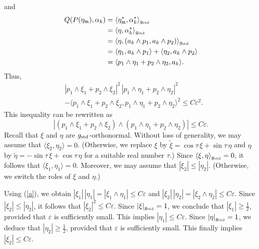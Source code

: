 \documentclass[11pt]{amsart}
\theoremstyle{definition}
\begin{document}
and 
\begin{align*} 
Q(P(\eta_{\mathfrak{m}}),\alpha_k) 
&= \langle \eta_{\mathfrak{m}}^*,\alpha_k^* \rangle_{g_{\text{\rm std}}} \\ 
&= \langle \eta,\alpha_k^* \rangle_{g_{\text{\rm std}}} \\ 
&= \langle \eta,(a_k \wedge p_1,a_k \wedge p_2) \rangle_{g_{\text{\rm std}}} \\ 
&= \langle \eta_1,a_k \wedge p_1 \rangle + \langle \eta_2,a_k \wedge p_2 \rangle \\ 
&= \langle p_1 \wedge \eta_1 + p_2 \wedge \eta_2,a_k \rangle. 
\end{align*} 
Thus, 
\begin{align*} 
&|p_1 \wedge \xi_1 + p_2 \wedge \xi_2|^2 \, |p_1 \wedge \eta_1 + p_2 \wedge \eta_2|^2 \\ 
&- \langle p_1 \wedge \xi_1 + p_2 \wedge \xi_2,p_1 \wedge \eta_1 + p_2 \wedge \eta_2 \rangle^2 \leq C\varepsilon^2. 
\end{align*}
This inequality can be rewritten as 
\begin{equation} 
\label{b}
|(p_1 \wedge \xi_1 + p_2 \wedge \xi_2) \wedge (p_1 \wedge \eta_1 + p_2 \wedge \eta_2)| \leq C\varepsilon. 
\end{equation} 
Recall that $\xi$ and $\eta$ are $g_{\text{\rm std}}$-orthonormal. Without loss of generality, we may assume that $\langle \xi_2,\eta_2 \rangle = 0$. (Otherwise, we replace $\xi$ by $\tilde{\xi} = \cos \tau \, \xi + \sin \tau \, \eta$ and $\eta$ by $\tilde{\eta} = -\sin \tau \, \xi + \cos \tau \, \eta$ for a suitable real number $\tau$.) Since $\langle \xi,\eta \rangle_{g_{\text{\rm std}}} = 0$, it follows that $\langle \xi_1,\eta_1 \rangle = 0$. Moreover, we may assume that $|\xi_2| \leq |\eta_2|$. (Otherwise, we switch the roles of $\xi$ and $\eta$.)

Using (\ref{a}), we obtain $|\xi_1| \, |\eta_1| = |\xi_1 \wedge \eta_1| \leq C\varepsilon$ and $|\xi_2| \, |\eta_2| = |\xi_2 \wedge \eta_2| \leq C\varepsilon$. Since $|\xi_2| \leq |\eta_2|$, it follows that $|\xi_2|^2 \leq C\varepsilon$. Since $|\xi|_{g_{\text{\rm std}}} = 1$, we conclude that $|\xi_1| \geq \frac{1}{2}$, provided that $\varepsilon$ is sufficiently small. This implies $|\eta_1| \leq C\varepsilon$.  Since $|\eta|_{g_{\text{\rm std}}} = 1$, we deduce that $|\eta_2| \geq \frac{1}{2}$, provided that $\varepsilon$ is sufficiently small. This finally implies $|\xi_2| \leq C\varepsilon$. 
\end{document}
